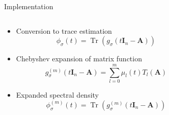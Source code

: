 \documentclass[aspectratio=169, leqno, 12pt]{beamer}
\newcommand{\mtx}[1]{\boldsymbol{#1}}
\DeclareMathOperator{\Tr}{Tr}
\begin{document}
\begin{frame}{Implementation}
    \begin{columns}
        \begin{column}{0.55\textwidth}
            \begin{itemize}
                \item Conversion to trace estimation
                \begin{equation}
                    \phi_{\sigma}(t) = \Tr(g_{\sigma}(t \mtx{I}_n - \mtx{A}))
                \end{equation}
                \item Chebyshev expansion of matrix function
                \begin{equation}
                    g_{\sigma}^{(m)}(t \mtx{I}_n - \mtx{A}) = \sum_{l=0}^m \mu_l(t) T_l(\mtx{A})
                \end{equation}
                \item Expanded spectral density
                \begin{equation}
                    \phi_{\sigma}^{(m)}(t) = \Tr(g_{\sigma}^{(m)}(t \mtx{I}_n - \mtx{A}))
                \end{equation}
            \end{itemize}
        \end{column}
        \begin{column}{0.45\textwidth}
            \scalebox{0.65}{}
        \end{column}
    \end{columns}
\end{frame}
\end{document}
